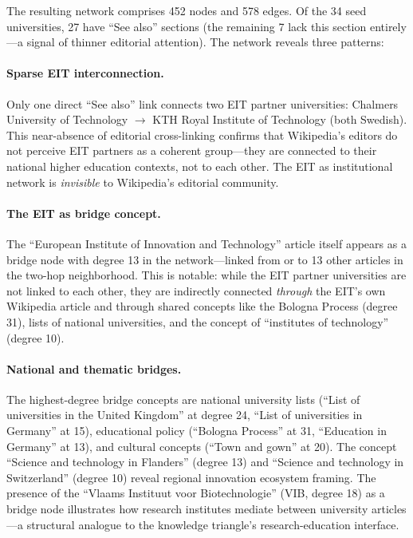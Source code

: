 \documentclass[../main.tex]{subfiles}
\begin{document}
The resulting network comprises 452 nodes and 578 edges. Of the 34 seed
universities, 27 have ``See also'' sections (the remaining 7 lack this
section entirely---a signal of thinner editorial attention). The network
reveals three patterns:

\paragraph{Sparse EIT interconnection.}
Only one direct ``See also'' link connects two EIT partner universities:
Chalmers University of Technology $\rightarrow$ KTH Royal Institute of
Technology (both Swedish). This near-absence of editorial cross-linking
confirms that Wikipedia's editors do not perceive EIT partners as a
coherent group---they are connected to their national higher education
contexts, not to each other. The EIT as institutional network is
\emph{invisible} to Wikipedia's editorial community.

\paragraph{The EIT as bridge concept.}
The ``European Institute of Innovation and Technology'' article itself
appears as a bridge node with degree 13 in the network---linked from
or to 13 other articles in the two-hop neighborhood. This is notable:
while the EIT partner universities are not linked to each other, they
are indirectly connected \emph{through} the EIT's own Wikipedia article
and through shared concepts like the Bologna Process (degree 31), lists
of national universities, and the concept of ``institutes of technology''
(degree 10).

\paragraph{National and thematic bridges.}
The highest-degree bridge concepts are national university lists
(``List of universities in the United Kingdom'' at degree 24,
``List of universities in Germany'' at 15), educational policy
(``Bologna Process'' at 31, ``Education in Germany'' at 13),
and cultural concepts (``Town and gown'' at 20). The concept
``Science and technology in Flanders'' (degree 13) and
``Science and technology in Switzerland'' (degree 10) reveal
regional innovation ecosystem framing. The presence of the
``Vlaams Instituut voor Biotechnologie'' (VIB, degree 18) as
a bridge node illustrates how research institutes mediate
between university articles---a structural analogue to the
knowledge triangle's research-education interface.
\end{document}
